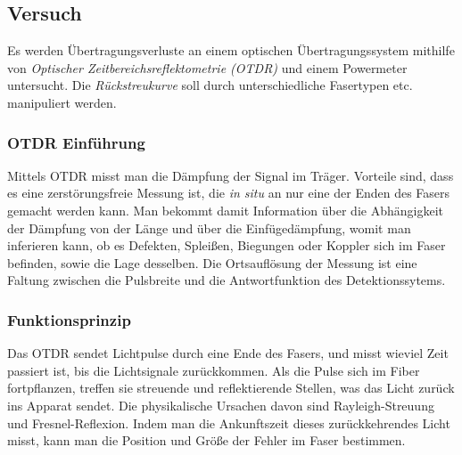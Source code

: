 \documentclass[a4paper]{article}
\begin{document}

\subsection{Versuch}
Es werden Übertragungsverluste an einem optischen Übertragungssystem
mithilfe von \emph{Optischer Zeitbereichsreflektometrie (OTDR)} und
einem Powermeter untersucht.
Die \emph{Rückstreukurve} soll durch unterschiedliche Fasertypen etc.
manipuliert werden.

\subsubsection{OTDR Einführung}
Mittels OTDR misst man die Dämpfung der Signal im Träger. Vorteile sind, dass
es eine zerstörungsfreie Messung ist, die \emph{in situ} an nur eine der Enden
des Fasers gemacht werden kann. Man bekommt damit Information über die
Abhängigkeit der Dämpfung von der Länge und über die Einfügedämpfung, womit man
inferieren kann, ob es Defekten, Spleißen, Biegungen oder Koppler sich im Faser
befinden, sowie die Lage desselben. Die Ortsauflösung der Messung ist eine
Faltung zwischen die Pulsbreite und die Antwortfunktion des Detektionssytems.  

\subsubsection{Funktionsprinzip} 
Das OTDR sendet Lichtpulse durch eine Ende des Fasers, und misst wieviel Zeit
passiert ist, bis die Lichtsignale zurückkommen.  Als die Pulse sich im Fiber
fortpflanzen, treffen sie streuende und reflektierende Stellen, was das Licht
zurück ins Apparat sendet. Die physikalische Ursachen davon sind
Rayleigh-Streuung und Fresnel-Reflexion.  Indem man die Ankunftszeit dieses
zurückkehrendes Licht misst, kann man die Position und Größe der Fehler im
Faser bestimmen.
\end{document}
